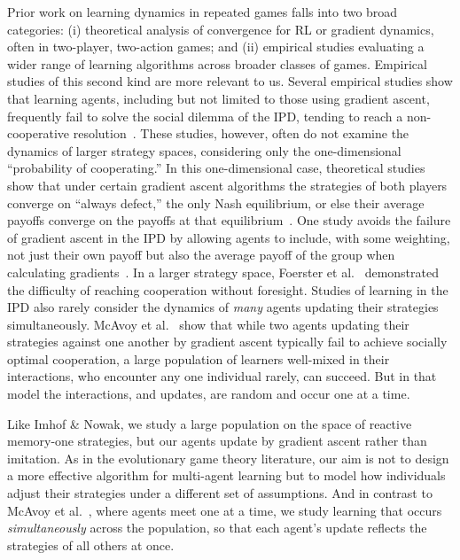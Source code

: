 \documentclass[10pt]{article}
\begin{document}
Prior work on learning dynamics in repeated games falls into two broad categories: (i) theoretical analysis of convergence for RL or gradient dynamics, often in two-player, two-action games; and (ii) empirical studies evaluating a wider range of learning algorithms across broader classes of games. Empirical studies of this second kind are more relevant to us. Several empirical studies show that learning agents, including but not limited to those using gradient ascent, frequently fail to solve the social dilemma of the IPD, tending to reach a non-cooperative resolution~\cite{sandholm1996-MultiagentReinforcementLearning,macy2002-LearningDynamicsSocial,tuyls2006-EvolutionaryDynamicalAnalysis,bloembergen2015-EvolutionaryDynamicsMultiAgent}. These studies, however, often do not examine the dynamics of larger strategy spaces, considering only the one-dimensional ``probability of cooperating.'' In this one-dimensional case, theoretical studies show that under certain gradient ascent algorithms the strategies of both players converge on ``always defect,'' the only Nash equilibrium, or else their average payoffs converge on the payoffs at that equilibrium~\cite{singh2000-NashConvergenceGradient,bowling2002-MultiagentLearningUsing}. One study avoids the failure of gradient ascent in the IPD by allowing agents to include, with some weighting, not just their own payoff but also the average payoff of the group when calculating gradients~\cite{zhang2019-SAIGAMultiagentReinforcement}. In a larger strategy space, Foerster et al.~\cite{foerster2018-LearningOpponentLearningAwareness} demonstrated the difficulty of reaching cooperation without foresight. Studies of learning in the IPD also rarely consider the dynamics of \textit{many} agents updating their strategies simultaneously. McAvoy et al.~\cite{mcavoy2022-SelfishOptimizationCollective} show that while two agents updating their strategies against one another by gradient ascent typically fail to achieve socially optimal cooperation, a large population of learners well-mixed in their interactions, who encounter any one individual rarely, can succeed. But in that model the interactions, and updates, are random and occur one at a time.

Like Imhof \& Nowak, we study a large population on the space of reactive memory-one strategies, but our agents update by gradient ascent rather than imitation. As in the evolutionary game theory literature, our aim is not to design a more effective algorithm for multi-agent learning but to model how individuals adjust their strategies under a different set of assumptions. And in contrast to McAvoy et al.~\cite{mcavoy2022-SelfishOptimizationCollective}, where agents meet one at a time, we study learning that occurs \textit{simultaneously} across the population, so that each agent's update reflects the strategies of all others at once.
\end{document}
